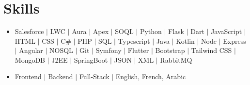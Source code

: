\documentclass[a4paper,12pt]{article}
\begin{document}
\section{Skills}
\begin{itemize}
\item \normalsize{Salesforce $\vert$ LWC $\vert$ Aura $\vert$ Apex $\vert$ SOQL $\vert$ Python $\vert$ Flask $\vert$ Dart $\vert$ JavaScript $\vert$ HTML $\vert$ CSS $\vert$ C\# $\vert$ PHP $\vert$ SQL  $\vert$ Typescript $\vert$ Java $\vert$ Kotlin $\vert$ Node $\vert$ Express $\vert$ Angular $\vert$ NOSQL $\vert$ Git $\vert$ Symfony $\vert$ Flutter $\vert$ Bootstrap $\vert$ Tailwind CSS $\vert$ MongoDB $\vert$ J2EE $\vert$ SpringBoot $\vert$ JSON $\vert$ XML $\vert$ RabbitMQ}\\
\item \normalsize{Frontend $\vert$ Backend $\vert$ Full-Stack $\vert$ English, French, Arabic}\\
\end{itemize}



\vfill
{}
\end{document}

